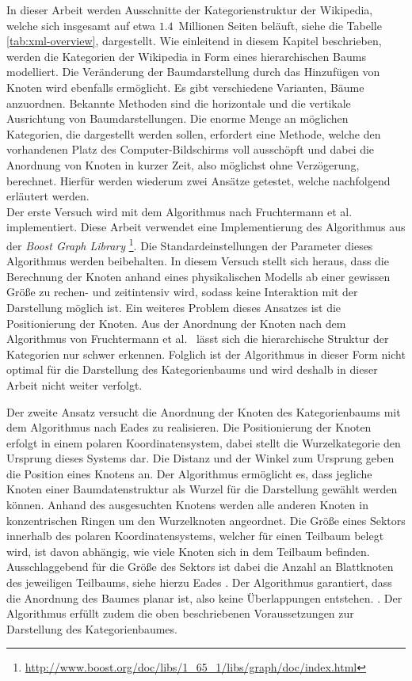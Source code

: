 In dieser Arbeit werden Ausschnitte der Kategorienstruktur der Wikipedia, welche sich insgesamt auf etwa $1.4$~Millionen Seiten beläuft, siehe die Tabelle \ref{tab:xml-overview}, dargestellt.
Wie einleitend in diesem Kapitel beschrieben, werden die Kategorien der Wikipedia in Form eines hierarchischen Baums modelliert.
Die Veränderung der Baumdarstellung durch das Hinzufügen von Knoten wird ebenfalls ermöglicht. 
Es gibt verschiedene Varianten, Bäume anzuordnen. 
Bekannte Methoden sind die horizontale und die vertikale Ausrichtung von Baumdarstellungen.
Die enorme Menge an möglichen Kategorien, die dargestellt werden sollen, erfordert eine Methode, welche den vorhandenen Platz des Computer-Bildschirms voll ausschöpft und dabei die Anordnung von Knoten in kurzer Zeit, also möglichst ohne Verzögerung, berechnet.
Hierfür werden wiederum zwei Ansätze getestet, welche nachfolgend erläutert werden.\\
Der erste Versuch wird mit dem Algorithmus nach Fruchtermann et al. \cite{fruchterman1991graph} implementiert.
Diese Arbeit verwendet eine Implementierung des Algorithmus aus der \emph{Boost Graph Library} \footnote{\url{http://www.boost.org/doc/libs/1_65_1/libs/graph/doc/index.html}}. Die Standardeinstellungen der Parameter dieses Algorithmus werden beibehalten.
In diesem Versuch stellt sich heraus, dass die Berechnung der Knoten anhand eines physikalischen Modells ab einer gewissen Größe zu rechen- und zeitintensiv wird, sodass keine Interaktion mit der Darstellung möglich ist.
Ein weiteres Problem dieses Ansatzes ist die Positionierung der Knoten.
Aus der Anordnung der Knoten nach dem Algorithmus von Fruchtermann et al.~\cite{fruchterman1991graph} lässt sich die hierarchische Struktur der Kategorien nur schwer erkennen. 
Folglich ist der Algorithmus in dieser Form nicht optimal für die Darstellung des Kategorienbaums und wird deshalb in dieser Arbeit nicht weiter verfolgt.

Der zweite Ansatz versucht die Anordnung der Knoten des Kategorienbaums mit dem Algorithmus nach Eades \cite{eades1991drawing} zu realisieren.
Die Positionierung der Knoten erfolgt in einem polaren Koordinatensystem, dabei stellt die Wurzelkategorie den Ursprung dieses Systems dar.
Die Distanz und der Winkel zum Ursprung geben die Position eines Knotens an.
Der Algorithmus ermöglicht es, dass jegliche Knoten einer Baumdatenstruktur als Wurzel für die Darstellung gewählt werden können. Anhand des ausgesuchten Knotens werden alle anderen Knoten in konzentrischen Ringen um den Wurzelknoten angeordnet.
Die Größe eines Sektors innerhalb des polaren Koordinatensystems, welcher für einen Teilbaum belegt wird, ist davon abhängig, wie viele Knoten sich in dem Teilbaum befinden.
Ausschlaggebend für die Größe des Sektors ist dabei die Anzahl an Blattknoten des jeweiligen Teilbaums, siehe hierzu Eades \cite[S.~15]{eades1991drawing}.
Der Algorithmus garantiert, dass die Anordnung des Baumes planar ist, also keine Überlappungen entstehen. \cite[S.~16]{eades1991drawing}.
Der Algorithmus erfüllt zudem die oben beschriebenen Voraussetzungen zur Darstellung des Kategorienbaumes.

